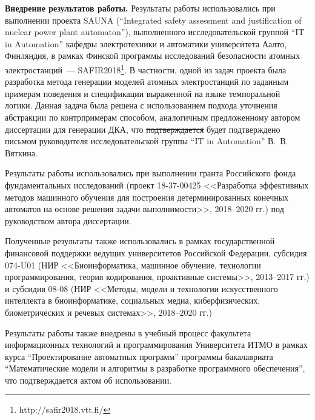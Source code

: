\textbf{Внедрение результатов работы.}
Результаты работы использовались при выполнении проекта SAUNA (``Integrated safety assessment and justification of nuclear power plant automaton''), выполненного исследовательской группой ``IT in Automation'' кафедры электротехники и автоматики университета Аалто, Финляндия, в рамках Финской программы исследований безопасности атомных электростанций~--- SAFIR2018\footnote{http://safir2018.vtt.fi/}.
В частности, одной из задач проекта была разработка метода генерации моделей атомных электростанций по заданным примерам поведения и спецификации выраженной на языке темпоральной логики.
Данная задача была решена с использованием подхода уточнения абстракции по контрпримерам способом, аналогичным предложенному автором диссертации для генерации ДКА, что \sout{подтверждается} будет подтверждено письмом руководителя исследовательской группы ``IT in Automation'' В.~В. Вяткина.

Результаты работы использовались при выполнении гранта Российского фонда фундаментальных исследований (проект 18-37-00425 <<Разработка эффективных методов машинного обучения для построения детерминированных конечных автоматов на основе решения задачи выполнимости>>, 2018--2020 гг.) под руководством автора диссертации.

Полученные результаты также использовались в рамках государственной финансовой поддержки ведущих университетов Российской Федерации, субсидия 074-U01 (НИР <<Биоинформатика, машинное обучение, технологии программирования, теория кодирования, проактивные системы>>, 2013--2017 гг.) и субсидия 08-08 (НИР <<Методы, модели и технологии искусственного интеллекта в биоинформатике, социальных медиа, киберфизических, биометрических и речевых системах>>, 2018--2020 гг.)

Результаты работы также внедрены в учебный процесс факультета информационных технологий и программирования Университета ИТМО в рамках курса ``Проектирование автоматных программ'' программы бакалавриата ``Математические модели и алгоритмы в разработке программного обеспечения'', что подтверждается актом об использовании.

